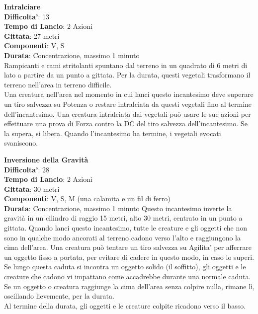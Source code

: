 \begin{multicols}{2}
\medskip\textbf{Intralciare}\\
\textbf{Difficolta'}: 13\\
\textbf{Tempo di Lancio}: 2 Azioni\\
\textbf{Gittata}: 27 metri\\
\textbf{Componenti}: V, S\\
\textbf{Durata}: Concentrazione, massimo 1 minuto\\
Rampicanti e rami stritolanti spuntano dal terreno in un quadrato di 6 metri di lato a partire da un punto a gittata. Per la durata, questi vegetali trasformano il terreno nell’area in terreno difficile.\\
Una creatura nell’area nel momento in cui lanci questo incantesimo deve superare un tiro salvezza su Potenza o restare intralciata da questi vegetali fino al termine dell’incantesimo. Una creatura intralciata dai vegetali può usare le sue azioni per effettuare una prova di Forza contro la DC del tiro salvezza dell’incantesimo. Se la supera, si libera. Quando l’incantesimo ha termine, i vegetali evocati svaniscono.

\medskip\textbf{Inversione della Gravità}\\
\textbf{Difficolta'}: 28\\
\textbf{Tempo di Lancio}: 2 Azioni\\
\textbf{Gittata}: 30 metri\\
\textbf{Componenti}: V, S, M (una calamita e un fil di ferro)\\
\textbf{Durata}: Concentrazione, massimo 1 minuto 
Questo incantesimo inverte la gravità in un cilindro di raggio 15 metri, alto 30 metri, centrato in un punto a gittata. Quando lanci questo incantesimo, tutte le creature e gli oggetti che non sono in qualche modo ancorati al terreno cadono verso l’alto e raggiungono la cima dell’area. Una creatura può tentare un tiro salvezza su Agilita' per afferrare un oggetto fisso a portata, per evitare di cadere in questo modo, in caso lo superi.\\
Se lungo questa caduta si incontra un oggetto solido (il soffitto), gli oggetti e le creature che cadono vi impattano come accadrebbe durante una normale caduta. Se un oggetto o creatura raggiunge la cima dell’area senza colpire nulla, rimane lì, oscillando lievemente, per la durata.\\
Al termine della durata, gli oggetti e le creature colpite ricadono verso il basso.


\end{multicols}

